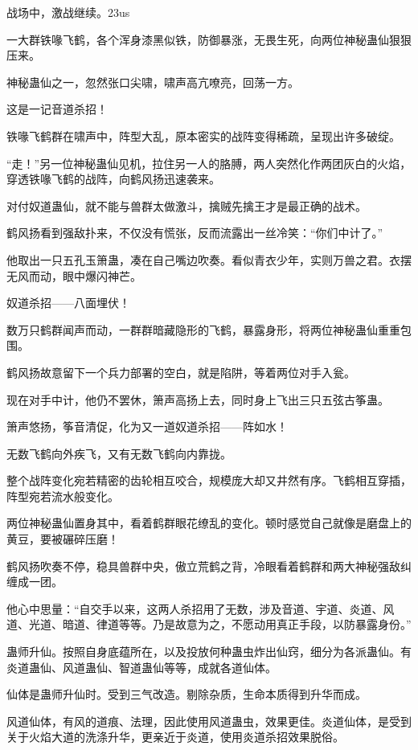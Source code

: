 
\begin{this_body}

战场中，激战继续。23us

一大群铁喙飞鹤，各个浑身漆黑似铁，防御暴涨，无畏生死，向两位神秘蛊仙狠狠压来。

神秘蛊仙之一，忽然张口尖啸，啸声高亢嘹亮，回荡一方。

这是一记音道杀招！

铁喙飞鹤群在啸声中，阵型大乱，原本密实的战阵变得稀疏，呈现出许多破绽。

“走！”另一位神秘蛊仙见机，拉住另一人的胳膊，两人突然化作两团灰白的火焰，穿透铁喙飞鹤的战阵，向鹤风扬迅速袭来。

对付奴道蛊仙，就不能与兽群太做激斗，擒贼先擒王才是最正确的战术。

鹤风扬看到强敌扑来，不仅没有慌张，反而流露出一丝冷笑：“你们中计了。”

他取出一只五孔玉箫蛊，凑在自己嘴边吹奏。看似青衣少年，实则万兽之君。衣摆无风而动，眼中爆闪神芒。

奴道杀招——八面埋伏！

数万只鹤群闻声而动，一群群暗藏隐形的飞鹤，暴露身形，将两位神秘蛊仙重重包围。

鹤风扬故意留下一个兵力部署的空白，就是陷阱，等着两位对手入瓮。

现在对手中计，他仍不罢休，箫声高扬上去，同时身上飞出三只五弦古筝蛊。

箫声悠扬，筝音清促，化为又一道奴道杀招——阵如水！

无数飞鹤向外疾飞，又有无数飞鹤向内靠拢。

整个战阵变化宛若精密的齿轮相互咬合，规模庞大却又井然有序。飞鹤相互穿插，阵型宛若流水般变化。

两位神秘蛊仙置身其中，看着鹤群眼花缭乱的变化。顿时感觉自己就像是磨盘上的黄豆，要被碾碎压磨！

鹤风扬吹奏不停，稳具兽群中央，傲立荒鹤之背，冷眼看着鹤群和两大神秘强敌纠缠成一团。

他心中思量：“自交手以来，这两人杀招用了无数，涉及音道、宇道、炎道、风道、光道、暗道、律道等等。乃是故意为之，不愿动用真正手段，以防暴露身份。”

蛊师升仙。按照自身底蕴所在，以及投放何种蛊虫炸出仙窍，细分为各派蛊仙。有炎道蛊仙、风道蛊仙、智道蛊仙等等，成就各道仙体。

仙体是蛊师升仙时。受到三气改造。剔除杂质，生命本质得到升华而成。

风道仙体，有风的道痕、法理，因此使用风道蛊虫，效果更佳。炎道仙体，是受到关于火焰大道的洗涤升华，更亲近于炎道，使用炎道杀招效果脱俗。


\end{this_body}
